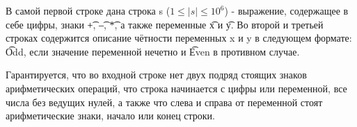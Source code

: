 В самой первой строке дана строка s ($1 \le |s| \le 10^6$) - выражение, содержащее в себе
цифры, знаки \t{+}, \t{--}, \t{*}, а также переменные \t{x} и \t{y}.
Во второй и третьей строках содержится описание 
чётности переменных x и y в следующем формате: \t{Odd}, если
значение переменной нечетно и \t{Even} в противном случае. 

Гарантируется, что во входной строке нет двух подряд стоящих знаков арифметических операций, 
что строка начинается с цифры или переменной, все числа без ведущих нулей,  
а также что слева и справа от переменной стоят арифметические знаки, начало или конец строки. 

